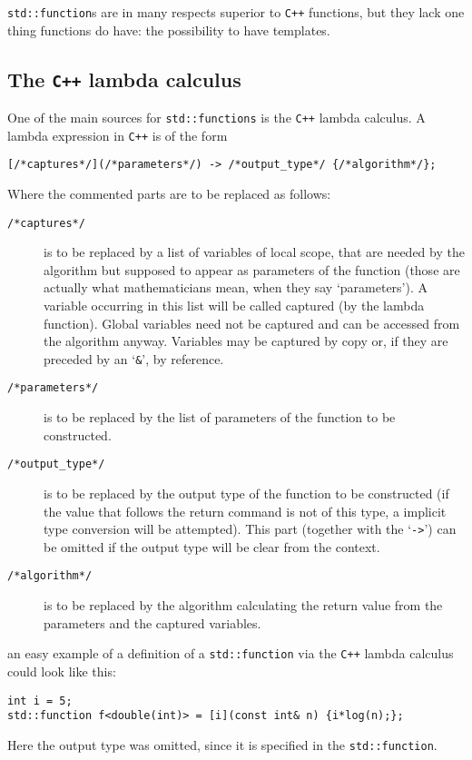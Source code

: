 \documentclass{article}
\newcommand{\cc}{\texttt{C++}\xspace}
\newcommand{\code}[1]{\texttt{#1}\xspace}
\begin{document}
\texttt{std::function}s are in many respects superior to \cc functions, but they lack one thing functions do have: the possibility to have templates.


\subsection{The \cc lambda calculus}\label{sec: The cc lambda calculus}

One of the main sources for \texttt{std::functions} is the \cc lambda calculus. A lambda expression in \cc is of the form
\begin{lstlisting}
[/*captures*/](/*parameters*/) -> /*output_type*/ {/*algorithm*/};
\end{lstlisting}
Where the commented parts are to be replaced as follows:
\begin{description}
\item[\textcolor{commentgray}{\code{/*captures*/}}] is to be replaced by a list of variables of local scope, that are needed by the algorithm but supposed to appear as parameters of the function (those are actually what mathematicians mean, when they say \lq parameters\rq). A variable occurring in this list will be called captured (by the lambda function). Global variables need not be captured and can be accessed from the algorithm anyway. Variables may be captured by copy or, if they are preceded by an \lq\texttt{\&}\rq, by reference.
\item[\textcolor{commentgray}{\code{/*parameters*/}}] is to be replaced by the list of parameters of the function to be constructed.
\item[\textcolor{commentgray}{\code{/*output\_type*/}}] is to be replaced by the output type of the function to be constructed (if the value that follows the return command is not of this type, a implicit type conversion will be attempted). This part (together with the \lq\texttt{->}\rq) can be omitted if the output type will be clear from the context.
\item[\textcolor{commentgray}{\code{/*algorithm*/}}] is to be replaced by the algorithm calculating the return value from the parameters and the captured variables.
\end{description}
an easy example of a definition of a \texttt{std::function} via the \cc lambda calculus could look like this:
\begin{lstlisting}
int i = 5;
std::function f<double(int)> = [i](const int& n) {i*log(n);};
\end{lstlisting}
Here the output type was omitted, since it is specified in the \texttt{std::function}.
\end{document}
